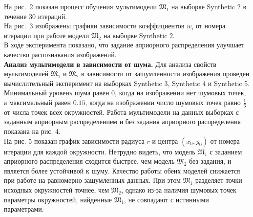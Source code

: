 \documentclass[12pt,twoside]{article}
\begin{document}
На рис.~2 показан процесс обучения мультимодели $\mathfrak{M}_1$ на выборке Synthetic 2 в течение 30 итераций. \\
На рис.~3 изображены графики зависимости коэффициентов $w_i$ от номера итерации при работе модели $\mathfrak{M}_2$ на выборке Synthetic 2.\\
В ходе эксперимента показано, что задание априорного распределения улучшает качество распознавания изображений.\\
\textbf{Анализ мультимодели в зависимости от шума.}  Для анализа свойств мультимоделей $\mathfrak{M}_1$ и $\mathfrak{M}_2$ в зависимости от зашумленности изображения проведен вычислительный эксперимент на выборках Synthetic 3, Synthetic 4 и Synthetic 5. Минимальный уровень шума равен 0, когда на изображении нет шумовых точек, а максимальный равен $0.15$, когда на изображении число шумовых точек равно $\frac{1}{6}$ от числа точек всех окружностей. Работа мультимодели на данных выборках с заданным априорным распределением и без задания априорного распределения показана на рис. 4.\\
На рис. 5 показан график зависимости радиуса $r$ и центра $(x_0, y_0)$ от номера итерации для каждой окружности. Нетрудно видеть, что  модель $\mathfrak{M}_1$ с заданием априорного распределения сходится быстрее, чем модель $\mathfrak{M}_2$ без задания, и является более устойчивой к шуму. Качество работы обеих моделей снижается при работе на равномерно зашумленных данных. При этом $\mathfrak{M}_1$ разделяет точки исходных окружностей точнее, чем $\mathfrak{M}_2$, однако из-за наличия шумовых точек параметры окружностей, найденные $\mathfrak{M}_1$, не совпадают с истинными параметрами.
\end{document}
